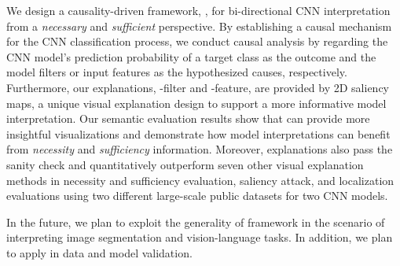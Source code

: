 We design a causality-driven framework, \name{}, for bi-directional CNN interpretation from a \textit{necessary} and \textit{sufficient} perspective.
By establishing a causal mechanism for the CNN classification process, we conduct causal analysis by regarding the CNN model's prediction probability of a target class as the outcome and the model filters or input features as the hypothesized causes, respectively.
Furthermore, our explanations, \name{}-filter and \name{}-feature, are provided by 2D saliency maps, a unique visual explanation design to support a more informative model interpretation.
Our semantic evaluation results show that \name{} can provide more insightful visualizations and demonstrate how model interpretations can benefit from \textit{necessity} and \textit{sufficiency} information.
Moreover, \name{} explanations also pass the sanity check and quantitatively outperform seven other visual explanation methods in necessity and sufficiency evaluation, saliency attack, and localization evaluations using two different large-scale public datasets for two CNN models.

In the future, we plan to exploit the generality of \name{} framework in the scenario of interpreting image segmentation and vision-language tasks. 
In addition, we plan to apply \name{} in data and model validation.